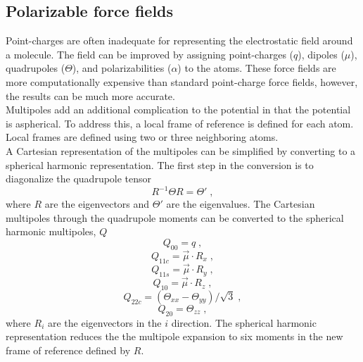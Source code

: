 \documentclass[12pt]{report}
\begin{document}
\subsection{Polarizable force fields}

Point-charges are often inadequate for representing the electrostatic field
around a molecule. The field can be improved by assigning point-charges ($q$),
dipoles ($\mu$), quadrupoles ($\Theta$), and polarizabilities ($\alpha$) to
the atoms. These force fields are more computationally expensive than standard
point-charge force fields, however, the results can be much more accurate. \\

Multipoles add an additional complication to the potential in that the
potential is aspherical. To address this, a local frame of reference is
defined for each atom. Local frames are defined using two or three neighboring
atoms. \\

A Cartesian representation of the multipoles can be simplified by converting
to a spherical harmonic representation. The first step in the conversion is to
diagonalize the quadrupole tensor
\begin{equation}
 R^{-1}\Theta R = \Theta' \; ,
\end{equation}
where $R$ are the eigenvectors and $\Theta'$ are the eigenvalues. The
Cartesian multipoles through the quadrupole moments can be converted to the
spherical harmonic multipoles, $Q$
\begin{equation}
 Q_{00} = q \; ,
\end{equation}
\begin{equation}
 Q_{11c} = \vec \mu \cdot R_x \; ,
\end{equation}
\begin{equation}
 Q_{11s} = \vec \mu \cdot R_y \; ,
\end{equation}
\begin{equation}
 Q_{10} = \vec \mu \cdot R_z \; ,
\end{equation}
\begin{equation}
 Q_{22c} = (\Theta_{xx}-\Theta_{yy})/\sqrt{3} \; ,
\end{equation}
\begin{equation}
 Q_{20} = \Theta_{zz} \; ,
\end{equation}
where $R_i$ are the eigenvectors in the $i$ direction. The spherical harmonic
representation reduces the the multipole expansion to six moments in the new
frame of reference defined by $R$. \cite{} \\
\end{document}
